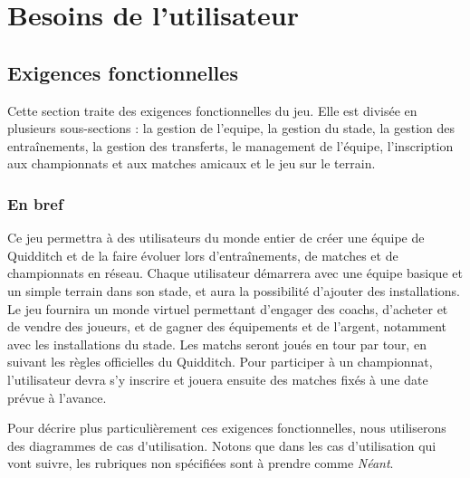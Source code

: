 \documentclass[a4paper, 11pt]{report}
\begin{document}
\renewcommand*{\glossaryname}{\section{Glossaire}}
\glsaddall
\printglossaries



\chapter{Besoins de l'utilisateur}

\section{Exigences fonctionnelles}
Cette section traite des exigences fonctionnelles du jeu. Elle est divisée en 
plusieurs sous-sections : la gestion de l'\gls{equipe}, la gestion du 
stade, la gestion des entraînements, la gestion des transferts, le management de l'équipe, l'inscription aux championnats et aux matches amicaux et le jeu sur le terrain.

\subsection{En bref}
Ce jeu permettra à des utilisateurs du monde entier de créer une équipe de 
Quidditch et de la faire évoluer lors d'entraînements, de matches et de 
championnats en réseau. Chaque utilisateur démarrera avec une équipe basique et 
un simple terrain dans son stade, et aura la possibilité d'ajouter des 
installations.
Le jeu fournira un monde virtuel permettant d'engager des \gls{coach}s, d'acheter et de vendre des \gls{joueur}s, 
et de gagner des équipements et de l'argent, notamment avec les 
installations du stade.
Les matchs seront joués en tour par tour, en suivant les règles officielles 
du Quidditch.
Pour participer à un championnat, l'utilisateur devra s'y inscrire et 
jouera ensuite des matches fixés à une date prévue à l'avance.

Pour décrire plus particulièrement ces exigences fonctionnelles, nous utiliserons des diagrammes de \gls{cas d'utilisation}. Notons que dans les cas d'utilisation qui vont suivre, les rubriques non spécifiées sont à prendre comme \textit{Néant}.

\setcounter{secnumdepth}{3}




\end{document}
